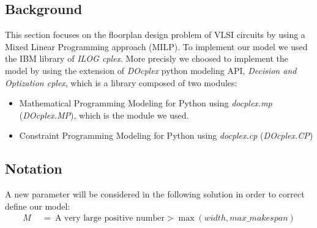 \subsection{Background}
    This section focuses on the floorplan design problem of VLSI circuits by using a Mixed Linear
    Programming approach (MILP). To implement our model we used the IBM library of 
    \textit{ILOG cplex}. More precisly we choosed to implement the model by using the extension of
    \textit{DOcplex} python modeling API, \textit{Decision and Optization cplex}, which is a 
    library composed of two modules:
    \begin{itemize}
        \item Mathematical Programming Modeling for Python using \textit{docplex.mp}
              (\textit{DOcplex.MP}), which is the module we used.
        \item Constraint Programming Modeling for Python using \textit{docplex.cp} (\textit{DOcplex.CP})
    \end{itemize}

\subsection{Notation}
    A new parameter will be considered in the following solution in order to correct define our model:
    \begin{align*}
        M\        &\ =\ \text{A very large positive number} > \max (width, max\_makespan)
    \end{align*}

